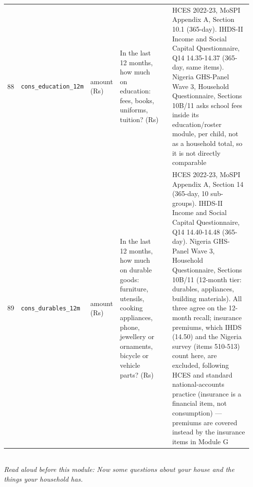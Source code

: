 \documentclass[9pt,a4paper,landscape]{article}
\begin{document}
\begin{longtable}{@{}p{0.5cm}p{3.3cm}p{1.7cm}p{7.3cm}p{5.6cm}p{5.4cm}@{}}
\footnotesize 88 & \footnotesize\texttt{cons\_education\_12m} & \scriptsize amount (Rs) & \footnotesize In the last 12 months, how much on education: fees, books, uniforms, tuition? (Rs)\par\vspace{1pt}{\footnotesize\color{hdr}{\hifont पिछले 12 महीनों में पढ़ाई पर कितना ख़र्च हुआ: फ़ीस, किताबें, ड्रेस, ट्यूशन? (रुपये)}} & \scriptsize  & \scriptsize HCES 2022-23, MoSPI Appendix A, Section 10.1 (365-day). IHDS-II Income and Social Capital Questionnaire, Q14 14.35-14.37 (365-day, same items). Nigeria GHS-Panel Wave 3, Household Questionnaire, Sections 10B/11 asks school fees inside its education/roster module, per child, not as a household total, so it is not directly comparable\\
\footnotesize 89 & \footnotesize\texttt{cons\_durables\_12m} & \scriptsize amount (Rs) & \footnotesize In the last 12 months, how much on durable goods: furniture, utensils, cooking appliances, phone, jewellery or ornaments, bicycle or vehicle parts? (Rs)\par\vspace{1pt}{\footnotesize\color{hdr}{\hifont पिछले 12 महीनों में सामान पर कितना ख़र्च हुआ: फ़र्नीचर, बर्तन, चूल्हा-मशीन, फ़ोन, गहने, साइकिल या गाड़ी के पुर्ज़े? (रुपये)}} & \scriptsize  & \scriptsize HCES 2022-23, MoSPI Appendix A, Section 14 (365-day, 10 sub-groups). IHDS-II Income and Social Capital Questionnaire, Q14 14.40-14.48 (365-day). Nigeria GHS-Panel Wave 3, Household Questionnaire, Sections 10B/11 (12-month tier: durables, appliances, building materials). All three agree on the 12-month recall; insurance premiums, which IHDS (14.50) and the Nigeria survey (items 510-513) count here, are excluded, following HCES and standard national-accounts practice (insurance is a financial item, not consumption) — premiums are covered instead by the insurance items in Module G\\
\bottomrule\end{longtable}\vspace{6pt}
\\[3pt]
{\small\itshape Read aloud before this module: Now some questions about your house and the things your household has.}\\[5pt]
\end{document}
